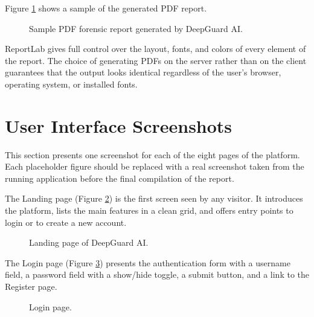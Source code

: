 Figure \ref{fig:pdf-report} shows a sample of the generated PDF report.

\begin{figure}[H]
\centering
{}
\caption{Sample PDF forensic report generated by DeepGuard AI.}
\label{fig:pdf-report}
\end{figure}

ReportLab gives full control over the layout, fonts, and colors of every element of the report. The choice of generating PDFs on the server rather than on the client guarantees that the output looks identical regardless of the user's browser, operating system, or installed fonts.

\section{User Interface Screenshots}

This section presents one screenshot for each of the eight pages of the platform. Each placeholder figure should be replaced with a real screenshot taken from the running application before the final compilation of the report.

The Landing page (Figure \ref{fig:ui-landing}) is the first screen seen by any visitor. It introduces the platform, lists the main features in a clean grid, and offers entry points to login or to create a new account.

\begin{figure}[H]
\centering
{}
\caption{Landing page of DeepGuard AI.}
\label{fig:ui-landing}
\end{figure}

The Login page (Figure \ref{fig:ui-login}) presents the authentication form with a username field, a password field with a show/hide toggle, a submit button, and a link to the Register page.

\begin{figure}[H]
\centering
{}
\caption{Login page.}
\label{fig:ui-login}
\end{figure}

